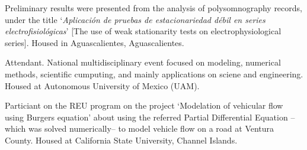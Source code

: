 \documentclass[a4paper,12pt]{memoir}
\begin{document}
{Preliminary results were presented from the analysis of polysomnography records, under the title `\textit{Aplicación de pruebas de estacionariedad débil en series electrofisiológicas}' [The use of weak stationarity tests on electrophysiological series].
%
Housed in Aguascalientes, Aguascalientes.}

\Sep


\clearpage %

\userinformation %

\framebreak %

\CVSection{}

{Attendant.
%
National multidisciplinary event focused on modeling, numerical methods, scientific cumputing, and mainly applications on sciene and engineering.
%
Housed at Autonomous University of Mexico (UAM).}

{Particiant on the REU program on the project `Modelation of vehicular flow using Burgers equation' about using the referred Partial Differential Equation --which was solved numerically-- to model vehicle flow on a road at Ventura County.
%
Housed at California State University, Channel Islands.}


\Sep %

\end{document}
